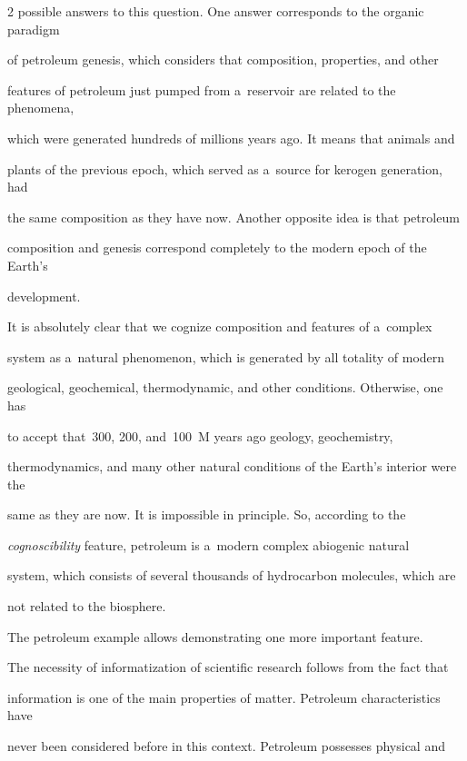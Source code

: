 \begin{multicols}{2}
possible answers to this question. One answer corresponds to the organic paradigm 

of petroleum genesis, which considers that composition, properties, and other 

features of petroleum just pumped from a~reservoir are related to the phenomena, 

which were generated hundreds of millions years ago. It means that animals and 

plants of the previous epoch, which served as a~source for kerogen generation, had 

the same composition as they have now. Another opposite idea is that petroleum 

composition and genesis correspond completely to the modern epoch of the Earth's 

development. 

     

     It is absolutely clear that we cognize composition and features of a~complex 

system as a~natural phenomenon, which is generated by all totality of modern 

geological, geochemical, thermodynamic, and other conditions. Otherwise, one has 

to accept that~300, 200, and~100~M years ago geology, geochemistry, 

thermodynamics, and many other natural conditions of the Earth's interior were the 

same as they are now. It is impossible in principle. So, according to the 

\textit{cognoscibility} feature, petroleum is a~modern complex abiogenic natural 

system, which consists of several thousands of hydrocarbon molecules, which are 

not related to the biosphere.

{



}

     

     The petroleum example allows demonstrating one more important feature. 

The necessity of informatization of scientific research follows from the fact that 

information is one of the main properties of matter. Petroleum characteristics have 

never been considered before in this context. Petroleum possesses physical and 


\end{multicols}
